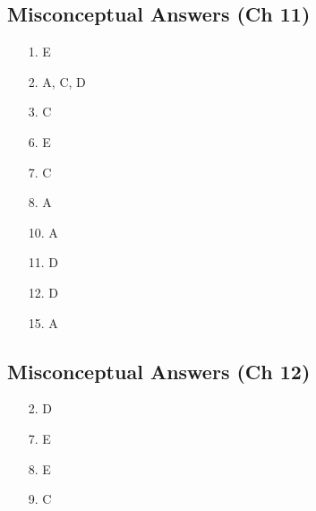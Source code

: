 \documentclass[10pt]{exam}
\begin{document}
\subsection*{Misconceptual Answers (Ch 11)}

\begin{multicols}{4}

  \begin{itemize}[noitemsep]
    \item[1. ] E
    \item[2. ] A, C, D
    \item[3. ] C
    \item[6. ] E
    \item[7. ] C
    \item[8. ] A
    \item[10.]  A
    \item[11.]  D
    \item[12.]  D
    \item[15.]  A
     
  \end{itemize}  
\end{multicols}

\subsection*{Misconceptual Answers (Ch 12)}

\begin{multicols}{4}

  \begin{itemize}[noitemsep]
    \item[2.]  D
    \item[7.]  E
    \item[8.]  E
    \item[9.]  C
  \end{itemize}  
\end{multicols}
\end{document}
